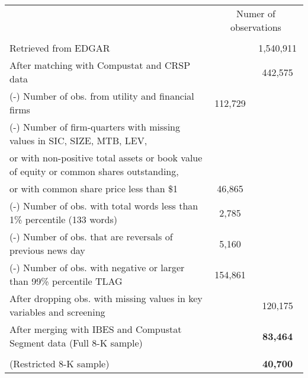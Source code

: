 \begin{table}[htbp]
\begin{tabular}{lcc}
     &   \multicolumn{2}{c}{Numer of observations}\\
      & &  \\
    Retrieved from EDGAR & & 1,540,911 \\
    After matching with Compustat and CRSP data  & & 442,575 \\
    (-) Number of obs. from utility and financial firms & 112,729 & \\
    (-) Number of firm-quarters with missing values in SIC, SIZE, MTB, LEV, & & \\
    \hspace{5mm}or with non-positive total assets or book value of equity or common shares outstanding, & & \\
    \hspace{5mm}or with common share price less than \$1 & 46,865 & \\
    (-) Number of obs. with total words less than 1\% percentile (133 words) & 2,785 & \\
    (-) Number of obs. that are reversals of previous news day & 5,160 & \\
    (-) Number of obs. with negative or larger than 99\% percentile TLAG  & 154,861 & \\
    \bottomrule
    After dropping obs. with missing values in key variables and screening  & & 120,175 \\
    After merging with IBES and Compustat Segment data (Full 8-K sample) & & \textbf{83,464}  \\
    \begin{comment}
    	After dropping obs. with TLAG larger than four (five) days after (before) the 8-K reform &  & \\
    	(Restricted 8-K sample) &  & \textbf{40,700} 
    \end{comment}
    \end{tabular}%
\end{table}%
